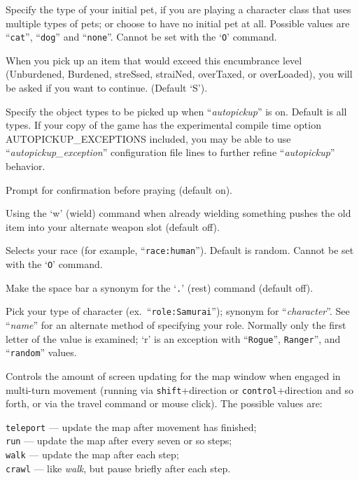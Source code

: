 \item[\ib{pettype}]
Specify the type of your initial pet, if you are playing a character class
that uses multiple types of pets; or choose to have no initial pet at all.
Possible values are ``{\tt cat}'', ``{\tt dog}'' and ``{\tt none}''.
Cannot be set with the `{\tt O}' command.
\item[\ib{pickup\_burden}]
When you pick up an item that would exceed this encumbrance
level (Unburdened, Burdened, streSsed, straiNed, overTaxed,
or overLoaded), you will be asked if you want to continue.
(Default `S').
\item[\ib{pickup\_types}]
Specify the object types to be picked up when ``{\it autopickup\/}'' 
is on.  Default is all types.  If your copy of the game has the
experimental compile time option AUTOPICKUP\_EXCEPTIONS included,
you may be able to use ``{\it autopickup\_exception\/}'' configuration
file lines to further refine ``{\it autopickup\/}'' behavior.
\item[\ib{prayconfirm}]
Prompt for confirmation before praying (default on).
\item[\ib{pushweapon}]
Using the `w' (wield) command when already wielding
something pushes the old item into your alternate weapon slot (default off).
\item[\ib{race}]
Selects your race (for example, ``{\tt race:human}'').  Default is random.
Cannot be set with the `{\tt O}' command.
\item[\ib{rest\_on\_space}]
Make the space bar a synonym for the `{\tt .}' (rest) command (default off).
\item[\ib{role}]
Pick your type of character (ex.\ ``{\tt role:Samurai}'');
synonym for ``{\it character\/}''.  See ``{\it name\/}'' for an alternate method
of specifying your role.  Normally only the first letter of the
value is examined; `r' is an exception with ``{\tt Rogue}'', {\tt Ranger}'',
and ``{\tt random}'' values.
\item[\ib{runmode}]
Controls the amount of screen updating for the map window when engaged
in multi-turn movement (running via {\tt shift}+direction
or {\tt control}+direction
and so forth, or via the travel command or mouse click).
The possible values are:

{\tt teleport} --- update the map after movement has finished;\\
{\tt run} --- update the map after every seven or so steps;\\
{\tt walk} --- update the map after each step;\\
{\tt crawl} --- like {\it walk\/}, but pause briefly after each step.

